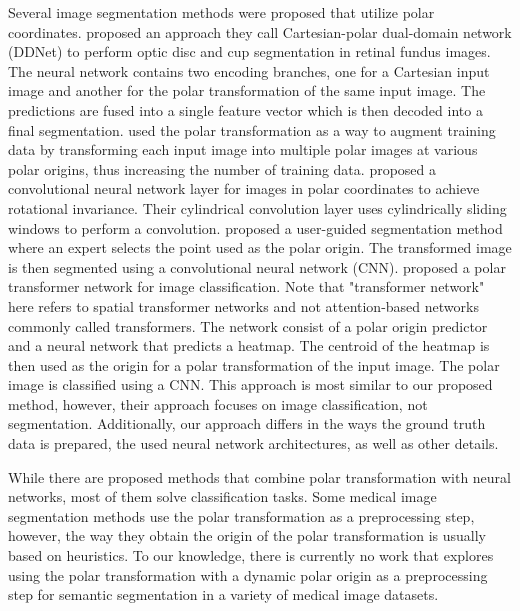 Several image segmentation methods were proposed that utilize polar coordinates. 
\citet{liuDDNetCartesianpolarDualdomain2019a} proposed an approach they
call Cartesian-polar dual-domain network (DDNet) to perform optic disc and cup segmentation
in retinal fundus images. The neural network contains two encoding branches, one for a Cartesian input image and another for the polar transformation of the same input image. The predictions are fused into a single feature vector which is then decoded into a final segmentation.
\citet{salehinejadImageAugmentationUsing2018} used the polar transformation as a way to 
augment
training data by transforming each input image into multiple polar images at various polar
origins, thus increasing the number of training data.
\citet{kimCyCNNRotationInvariant2020a} proposed a convolutional neural network layer for 
images in polar 
coordinates to achieve rotational invariance. Their cylindrical convolution layer uses cylindrically sliding windows to perform a convolution.
\citet{kimCNNBasedUGS2018} proposed a user-guided segmentation method where an expert 
selects the
point used as the polar origin. The transformed image is then
segmented using a convolutional neural network (CNN). 
\citet{estevesPolarTransformerNetworks2018a} proposed a polar transformer network for image 
classification. Note that "transformer network" here refers to spatial transformer networks 
\cite{jaderbergSpatialTransformerNetworks2016} and not attention-based networks commonly called 
transformers.
The network 
consist of a polar origin predictor and a neural network that predicts a heatmap. The centroid of the heatmap is then used as the origin for a polar transformation of the input image. The polar image is classified using a CNN. This approach is most similar to our proposed method, 
however, their approach focuses on image classification, not segmentation. Additionally, our approach differs in the ways the ground truth data is prepared, the used neural network architectures, as well as other details.

While there are proposed methods that combine polar transformation with neural networks, most of them solve classification tasks. Some medical image segmentation methods use the polar transformation as a preprocessing step, however, the way they obtain the origin of the polar transformation is usually based on heuristics. To our knowledge, there is currently no work that explores using the polar transformation with a dynamic polar origin as a preprocessing step for semantic segmentation in a variety of medical image datasets.

